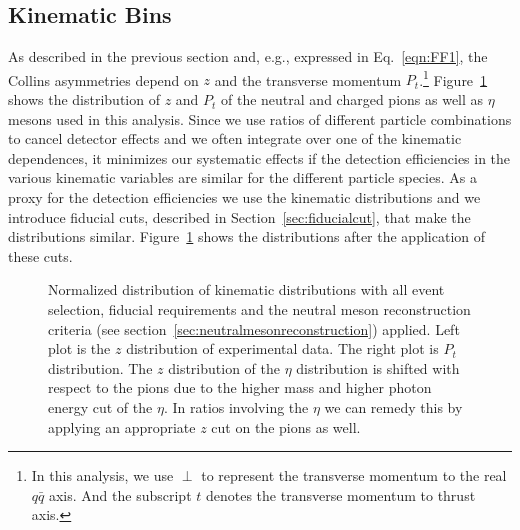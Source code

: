 \subsection{Kinematic Bins}
\label{sec:kinematicbins}
As described in the previous section and, e.g., expressed in Eq.~\eqref{eqn:FF1}, the Collins asymmetries depend on $z$ and the transverse momentum $P_t$.\footnote{In this analysis, we use $\perp$ to represent the transverse momentum to the real $q\bar{q}$ axis. And the subscript $t$ denotes the transverse momentum to thrust axis.}
Figure~\ref{fig:zptdistri} shows the distribution of $z$ and $P_t$ of the neutral and charged pions as well as $\eta$ mesons used in this analysis. Since we use ratios of different particle combinations to cancel detector effects and we often integrate over one of the kinematic dependences, it minimizes our systematic effects if the detection efficiencies in the various kinematic variables are similar for the different particle species. As a proxy for the detection efficiencies we use the kinematic distributions and we introduce fiducial cuts, described in Section~\ref{sec:fiducialcut}, that make the distributions similar. Figure~\ref{fig:zptdistri} shows the distributions after the application of these cuts.
\begin{figure}[H]
  \centering     
  \caption[Normalized kinematic distributions]{Normalized distribution of kinematic distributions with all event selection, fiducial requirements and the neutral meson reconstruction criteria (see section~\ref{sec:neutralmesonreconstruction}) applied. Left plot is the $z$ distribution of experimental data. The right plot is $P_t$ distribution. The $z$ distribution of the $\eta$ distribution is shifted with respect to the pions due to the higher mass and higher photon energy cut of the $\eta$. In ratios involving the $\eta$ we can remedy this by applying an appropriate $z$ cut on the pions as well.}
  \label{fig:zptdistri}
\end{figure}

